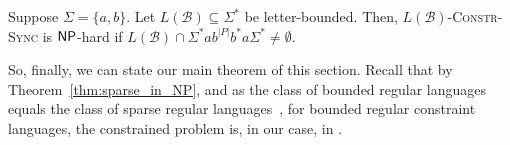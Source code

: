 \begin{lemmarep}
\label{lem:np_hardness}
 Suppose $\Sigma = \{a,b\}$. %
 Let $L(\mathcal B) \subseteq \Sigma^*$ be letter-bounded.
 Then, $L(\mathcal B)$\textsc{-Constr-Sync}
 is $\textsf{NP}$-hard %
 if $L(\mathcal B) \cap \Sigma^* a  b^{|P|}b^*  a \Sigma^* \ne \emptyset$.
\end{lemmarep}




So, finally, we can state our main theorem of this section.
Recall that by Theorem~\ref{thm:sparse_in_NP},
and as the class of bounded regular languages equals
the class of sparse regular languages~\cite{DBLP:journals/eik/LatteuxT84}, for bounded regular constraint
languages, the constrained problem is, in our case, in \NP. 
 
